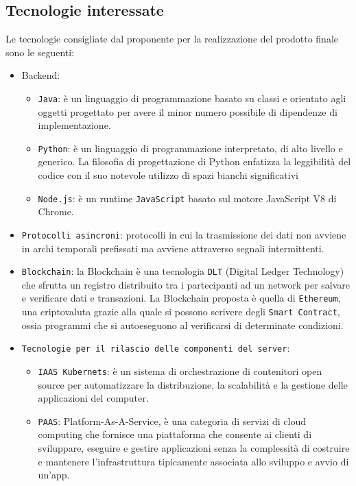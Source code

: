 \subsection{Tecnologie interessate}
Le tecnologie consigliate dal proponente per la realizzazione del prodotto finale sono le seguenti:
\begin{itemize}
	\item Backend:
	      \begin{itemize}
		      \item \verb|Java|: è un linguaggio di programmazione basato su classi e orientato agli oggetti progettato per avere il minor numero possibile di dipendenze di implementazione.
		      \item \verb|Python|: è un linguaggio di programmazione interpretato, di alto livello e generico. La filosofia di progettazione di Python enfatizza la leggibilità del codice con il suo notevole utilizzo di spazi bianchi significativi
		      \item \verb|Node.js|: è un runtime \verb|JavaScript| basato sul motore JavaScript V8 di Chrome.
	      \end{itemize}
	\item \verb|Protocolli asincroni|: protocolli in cui la trasmissione dei dati non avviene in archi temporali prefissati ma avviene attraverso segnali intermittenti.
	\item \verb|Blockchain|: la Blockchain è una tecnologia \verb|DLT| (Digital Ledger Technology) che sfrutta un registro distribuito tra i partecipanti ad un network per salvare e verificare dati e transazioni. La Blockchain proposta è quella di \verb|Ethereum|, una criptovaluta grazie alla quale si possono scrivere degli \verb|Smart Contract|, ossia programmi che si autoeseguono al verificarsi di determinate condizioni.
	\item \verb|Tecnologie per il rilascio delle componenti del server|:
	      \begin{itemize}
		      \item \verb|IAAS Kubernets|: è un sistema di orchestrazione di contenitori open source per automatizzare la distribuzione, la scalabilità e la gestione delle applicazioni del computer.
		      \item \verb|PAAS|: Platform-As-A-Service, è una categoria di servizi di cloud computing che fornisce una piattaforma che consente ai clienti di sviluppare, eseguire e gestire applicazioni senza la complessità di costruire e mantenere l'infrastruttura tipicamente associata allo sviluppo e avvio di un'app.
	      \end{itemize}
\end{itemize}

